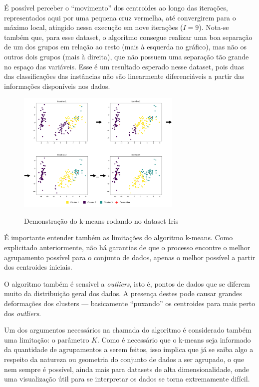 \documentclass[12pt,
openright, 
oneside, %
a4paper,    %
brazil]{facom-ufu-abntex2}
\begin{document}
É possível perceber o \enquote{movimento} dos centroides ao longo das iterações, representados aqui por uma pequena cruz vermelha, até convergirem para o máximo local, atingido nessa execução em nove iterações ($I = 9$). Nota-se também que, para esse dataset, o algoritmo consegue realizar uma boa separação de um dos grupos em relação ao resto (mais à esquerda no gráfico), mas não os outros dois grupos (mais à direita), que não possuem uma separação tão grande no espaço das variáveis. Esse é um resultado esperado nesse dataset, pois duas das classificações das instâncias não são linearmente diferenciáveis a partir das informações disponíveis nos dados.

\begin{figure}[h]
  \caption{Demonstração do k-means rodando no dataset Iris}
  \centering
  \includegraphics[width=0.7\textwidth]{demo_kmeans_iris.png}
  \label{fig:kMeansDemoIris}
\end{figure}

É importante entender também as limitações do algoritmo k-means. Como explicitado anteriormente, não há garantias de que o processo encontre o melhor agrupamento possível para o conjunto de dados, apenas o melhor possível a partir dos centroides iniciais.

O algoritmo também é sensível a \textit{outliers}, isto é, pontos de dados que se diferem muito da distribuição geral dos dados. A presença destes pode causar grandes deformações dos clusters --- basicamente \enquote{puxando} os centroides para mais perto dos \textit{outliers}.

Um dos argumentos necessários na chamada do algoritmo é considerado também uma limitação: o parâmetro $K$. Como é necessário que o k-means seja informado da quantidade de agrupamentos a serem feitos, isso implica que já se saiba algo a respeito da natureza ou geometria do conjunto de dados a ser agrupado, o que nem sempre é possível, ainda mais para datasets de alta dimensionalidade, onde uma visualização útil para se interpretar os dados se torna extremamente difícil.
\end{document}
